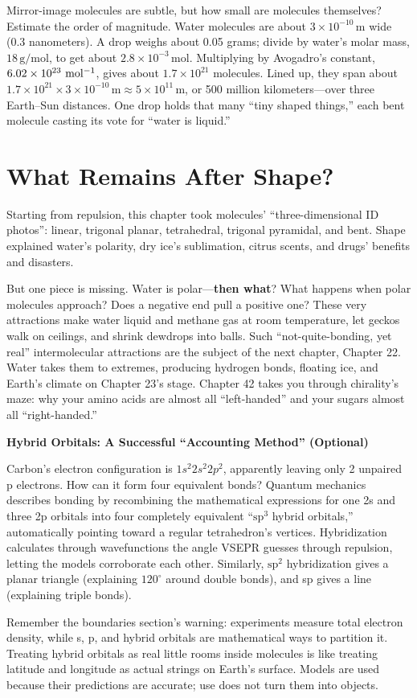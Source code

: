 Mirror-image molecules are subtle, but how small are molecules themselves? Estimate the order of magnitude. Water molecules are about $3\times 10^{-10}\,\mathrm{m}$ wide (0.3 nanometers). A drop weighs about 0.05 grams; divide by water's molar mass, $18\,\mathrm{g/mol}$, to get about $2.8\times 10^{-3}\,\mathrm{mol}$. Multiplying by Avogadro's constant, $6.02\times 10^{23}\ \mathrm{mol^{-1}}$, gives about $1.7\times 10^{21}$ molecules. Lined up, they span about $1.7\times 10^{21} \times 3\times 10^{-10}\,\mathrm{m} \approx 5\times 10^{11}\,\mathrm{m}$, or 500 million kilometers---over three Earth--Sun distances. One drop holds that many ``tiny shaped things,'' each bent molecule casting its vote for ``water is liquid.''

\section{What Remains After Shape?}

Starting from repulsion, this chapter took molecules' ``three-dimensional ID photos'': linear, trigonal planar, tetrahedral, trigonal pyramidal, and bent. Shape explained water's polarity, dry ice's sublimation, citrus scents, and drugs' benefits and disasters.

But one piece is missing. Water is polar---\textbf{then what}? What happens when polar molecules approach? Does a negative end pull a positive one? These very attractions make water liquid and methane gas at room temperature, let geckos walk on ceilings, and shrink dewdrops into balls. Such ``not-quite-bonding, yet real'' intermolecular attractions are the subject of the next chapter, Chapter 22. Water takes them to extremes, producing hydrogen bonds, floating ice, and Earth's climate on Chapter 23's stage. Chapter 42 takes you through chirality's maze: why your amino acids are almost all ``left-handed'' and your sugars almost all ``right-handed.''

\begin{tiaozhan}
\textbf{Hybrid Orbitals: A Successful ``Accounting Method'' (Optional)}

Carbon's electron configuration is $1s^2 2s^2 2p^2$, apparently leaving only 2 unpaired p electrons. How can it form four equivalent bonds? Quantum mechanics describes bonding by recombining the mathematical expressions for one 2s and three 2p orbitals into four completely equivalent ``$\mathrm{sp^3}$ hybrid orbitals,'' automatically pointing toward a regular tetrahedron's vertices. Hybridization calculates through wavefunctions the angle VSEPR guesses through repulsion, letting the models corroborate each other. Similarly, $\mathrm{sp^2}$ hybridization gives a planar triangle (explaining $120^{\circ}$ around double bonds), and sp gives a line (explaining triple bonds).

Remember the boundaries section's warning: experiments measure total electron density, while s, p, and hybrid orbitals are mathematical ways to partition it. Treating hybrid orbitals as real little rooms inside molecules is like treating latitude and longitude as actual strings on Earth's surface. Models are used because their predictions are accurate; use does not turn them into objects.
\end{tiaozhan}


